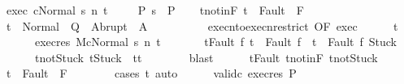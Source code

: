 \begin{isabellebody}
\ exec{\isacharcolon}\ {\isachardoublequoteopen}{\isasymGamma}{\isasymturnstile}{\isasymlangle}c{\isacharcomma}Normal\ s{\isasymrangle}\ {\isacharequal}n{\isasymRightarrow}\ t{\isachardoublequoteclose}\ \isanewline
\ \ \isamarkupfalse%
\ P{\isacharcolon}\ {\isachardoublequoteopen}s\ {\isasymin}\ P{\isachardoublequoteclose}\isanewline
\ \ \isamarkupfalse%
\ t{\isacharunderscore}notin{\isacharunderscore}F{\isacharcolon}\ {\isachardoublequoteopen}t\ {\isasymnotin}\ Fault\ {\isacharbackquote}\ F{\isachardoublequoteclose}\isanewline
\ \ \isamarkupfalse%
\ {\isachardoublequoteopen}t\ {\isasymin}\ Normal\ {\isacharbackquote}\ Q\ {\isasymunion}\ Abrupt\ {\isacharbackquote}\ A{\isachardoublequoteclose}\isanewline
\ \ \isamarkupfalse%
\ {\isacharminus}\isanewline
\ \ \ \ \isamarkupfalse%
\ execn{\isacharunderscore}to{\isacharunderscore}execn{\isacharunderscore}restrict\ {\isacharbrackleft}OF\ exec{\isacharbrackright}\isanewline
\ \ \ \ \isamarkupfalse%
\ t{\isacharprime}\ \isanewline
\ \ \ \ \ \ exec{\isacharunderscore}res{\isacharcolon}\ {\isachardoublequoteopen}{\isasymGamma}{\isacharbar}\isactrlbsub M\isactrlesub {\isasymturnstile}{\isasymlangle}c{\isacharcomma}Normal\ s{\isasymrangle}\ {\isacharequal}n{\isasymRightarrow}\ t{\isacharprime}{\isachardoublequoteclose}\ \isanewline
\ \ \ \ \ \ t{\isacharunderscore}Fault{\isacharcolon}\ {\isachardoublequoteopen}{\isasymforall}f{\isachardot}\ t\ {\isacharequal}\ Fault\ f\ {\isasymlongrightarrow}\ t{\isacharprime}\ {\isasymin}\ {\isacharbraceleft}Fault\ f{\isacharcomma}\ Stuck{\isacharbraceright}{\isachardoublequoteclose}\ \isanewline
\ \ \ \ \ \ t{\isacharprime}{\isacharunderscore}notStuck{\isacharcolon}\ {\isachardoublequoteopen}t{\isacharprime}{\isasymnoteq}Stuck\ {\isasymlongrightarrow}\ t{\isacharprime}{\isacharequal}t{\isachardoublequoteclose}\isanewline
\ \ \ \ \ \ \isamarkupfalse%
\ blast\isanewline
\ \ \ \ \isamarkupfalse%
\ t{\isacharunderscore}Fault\ t{\isacharunderscore}notin{\isacharunderscore}F\ t{\isacharprime}{\isacharunderscore}notStuck\ \isamarkupfalse%
\ {\isachardoublequoteopen}t{\isacharprime}\ {\isasymnotin}\ Fault\ {\isacharbackquote}\ F{\isachardoublequoteclose}\isanewline
\ \ \ \ \ \ \isamarkupfalse%
\ {\isacharparenleft}cases\ t{\isacharprime}{\isacharparenright}\ auto\isanewline
\ \ \ \ \isamarkupfalse%
\ valid{\isacharunderscore}c\ exec{\isacharunderscore}res\ P\ \isanewline

\end{isabellebody}
